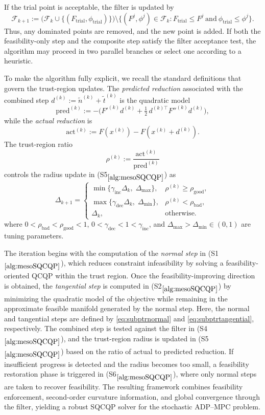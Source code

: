 \documentclass{article}
\newcommand{\1}{\mathds{1}}          %
\theoremstyle{definition}
\begin{document}
\begin{sloppypar}
If the trial point is acceptable, the filter is updated by
\[
\mathcal F_{k+1}
:= \bigl(\mathcal F_k \cup \{(F_{\mathrm{trial}},\phi_{\mathrm{trial}})\}\bigr)
\setminus 
\bigl\{(F^{j},\phi^{j})\in\mathcal F_k :
F_{\mathrm{trial}} \le F^{j}\ \text{and}\ 
\phi_{\mathrm{trial}} \le \phi^{j}
\bigr\}.
\]
Thus, any dominated points are removed, and the new point is added.  
If both the feasibility-only step and the composite step satisfy the
filter acceptance test, the algorithm may proceed in two parallel
branches or select one according to a heuristic.

To make the algorithm fully explicit, we recall the standard definitions
that govern the trust-region updates.  The \emph{predicted reduction}
associated with the combined step 
$d^{(k)} := \tilde n^{(k)} + \tilde t^{(k)}$ is the quadratic model
\[
\mathrm{pred}^{(k)}
:= -\Big(
   F'^{(k)} d^{(k)} 
   + \tfrac12\, d^{(k)\top} F''^{(k)} d^{(k)}
  \Big),
\]
while the \emph{actual reduction} is
\[
\mathrm{act}^{(k)}
:= F(x^{(k)}) - F\!\left(x^{(k)} + d^{(k)}\right).
\]
The trust-region ratio
\[
\rho^{(k)}
:= \frac{\mathrm{act}^{(k)}}{\mathrm{pred}^{(k)}}
\]
controls the radius update in
(S5$_{\ref{alg:mesoSQCQP}}$) as
\[
\Delta_{k+1} = 
\begin{cases}
\min\{\gamma_{\mathrm{inc}}\Delta_k,\;\Delta_{\max}\},
& \rho^{(k)} \ge \rho_{\mathrm{good}},\\[6pt]
\max\{\gamma_{\mathrm{dec}}\Delta_k,\;\Delta_{\min}\},
& \rho^{(k)} < \rho_{\mathrm{bad}},\\[6pt]
\Delta_k,
& \text{otherwise}.
\end{cases}
\]
where $0 < \rho_{\mathrm{bad}} < \rho_{\mathrm{good}} < 1$,  
\(0 < \gamma_{\mathrm{dec}} < 1 < \gamma_{\mathrm{inc}}\), and $\Delta_{\max}> \Delta_{\min}\in(0,1)$ are tuning parameters.

The iteration begins with the computation of the \emph{normal step} in
(S1$_{\ref{alg:mesoSQCQP}}$), which reduces constraint infeasibility by
solving a feasibility-oriented QCQP within the trust region.  Once the
feasibility-improving direction is obtained, the \emph{tangential
step} is computed in (S2$_{\ref{alg:mesoSQCQP}}$) by minimizing the
quadratic model of the objective while remaining in the approximate
feasible manifold generated by the normal step.  Here, the normal and tangential steps are defined by
\eqref{eq:subptrnormal} and \eqref{eq:subptrtangential}, respectively.
 The combined step is
tested against the filter in (S4$_{\ref{alg:mesoSQCQP}}$), and the
trust-region radius is updated in (S5$_{\ref{alg:mesoSQCQP}}$) based on
the ratio of actual to predicted reduction.  If insufficient progress
is detected and the radius becomes too small, a feasibility restoration
phase is triggered in (S6$_{\ref{alg:mesoSQCQP}}$), where only normal
steps are taken to recover feasibility.  The resulting framework
combines feasibility enforcement, second-order curvature information,
and global convergence through the filter, yielding a robust SQCQP
solver for the stochastic ADP--MPC problem.



\end{sloppypar}
\end{document}
